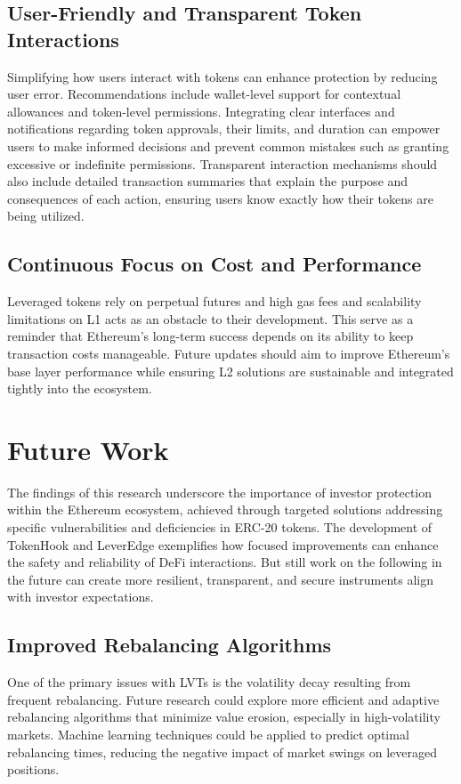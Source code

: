 \subsection{User-Friendly and Transparent Token Interactions}
Simplifying how users interact with tokens can enhance protection by reducing user error. Recommendations include wallet-level support for contextual allowances and token-level permissions. Integrating clear interfaces and notifications regarding token approvals, their limits, and duration can empower users to make informed decisions and prevent common mistakes such as granting excessive or indefinite permissions. Transparent interaction mechanisms should also include detailed transaction summaries that explain the purpose and consequences of each action, ensuring users know exactly how their tokens are being utilized. 

\subsection{Continuous Focus on Cost and Performance}
Leveraged tokens rely on perpetual futures and high gas fees and scalability limitations on L1 acts as an obstacle to their development. This serve as a reminder that Ethereum’s long-term success depends on its ability to keep transaction costs manageable. Future updates should aim to improve Ethereum's base layer performance while ensuring L2 solutions are sustainable and integrated tightly into the ecosystem.

\section{Future Work}
The findings of this research underscore the importance of investor protection within the Ethereum ecosystem, achieved through targeted solutions addressing specific vulnerabilities and deficiencies in ERC-20 tokens. The development of TokenHook and LeverEdge exemplifies how focused improvements can enhance the safety and reliability of DeFi interactions. But still work on the following in the future can create more resilient, transparent, and secure instruments align with investor expectations.

\subsection{Improved Rebalancing Algorithms}
One of the primary issues with LVTs is the volatility decay resulting from frequent rebalancing. Future research could explore more efficient and adaptive rebalancing algorithms that minimize value erosion, especially in high-volatility markets. Machine learning techniques could be applied to predict optimal rebalancing times, reducing the negative impact of market swings on leveraged positions.

